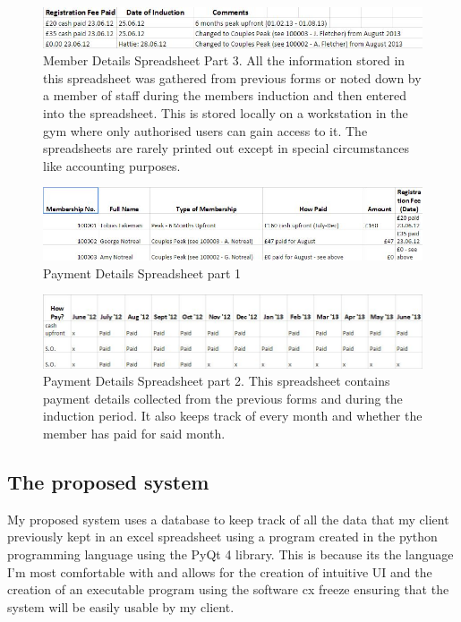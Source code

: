 \begin{figure}[H]
    \includegraphics[width=\textwidth]{MembershipSpreadsheet3.JPG}
    \caption{Member Details Spreadsheet Part 3. All the information stored in this spreadsheet was gathered from previous forms or noted down by a member of staff during the members induction and then entered into the spreadsheet. This is stored locally on a workstation in the gym where only authorised users can gain access to it. The spreadsheets are rarely printed out except in special circumstances like accounting purposes.} \label{fig:Member Details Spreadsheet Part 3}
\end{figure}

\begin{figure}[H]
    \includegraphics[width=\textwidth]{PaymentSpreadsheet1.JPG}
    \caption{Payment Details Spreadsheet part 1} \label{fig:Payment Details Spreadsheet Part 1}
\end{figure}

\begin{figure}[H]
    \includegraphics[width=\textwidth]{PaymentSpreadsheet2.JPG}
    \caption{Payment Details Spreadsheet part 2. This spreadsheet contains payment details collected from the previous forms and during the induction period. It also keeps track of every month and whether the member has paid for said month.  } \label{fig:Payment Details Spreadsheet part 2 }
\end{figure}


\subsection{The proposed system}

My proposed system uses a database to keep track of all the data that my client previously kept in an excel spreadsheet using a program created in the python programming language using the PyQt 4 library. This is because its the language I'm most comfortable with and allows for the creation of intuitive UI and the creation of an executable program using the software cx freeze ensuring that the system will be easily usable by my client.


